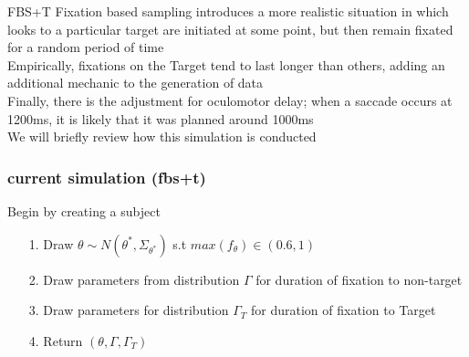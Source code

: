 \documentclass{beamer}
\begin{document}
\begin{frame}{FBS+T}
Fixation based sampling introduces a more realistic situation in which looks to a particular target are initiated at some point, but then remain fixated for a random period of time \newline \\

Empirically, fixations on the Target tend to last longer than others, adding an additional mechanic to the generation of data \newline \\

Finally, there is the adjustment for oculomotor delay; when a saccade occurs at 1200ms, it is likely that it was planned around 1000ms \newline \\

We will briefly review how this simulation is conducted

\end{frame}

\begin{frame}[fragile]
\frametitle{current simulation (fbs+t)}
Begin by creating a subject \newline \\

  \begin{enumerate}
  \item[1.] Draw $\theta \sim N(\theta^*, \Sigma_{\theta^*})$ s.t $max(f_{\theta}) \in (0.6, 1)$
  \item[2.] Draw parameters from distribution $\Gamma$ for duration of fixation to non-target
  \item[3.] Draw parameters for distribution $\Gamma_T$ for duration of fixation to Target
  \item[4.] Return $(\theta, \Gamma, \Gamma_T)$
  \end{enumerate}

\end{frame}
\end{document}
